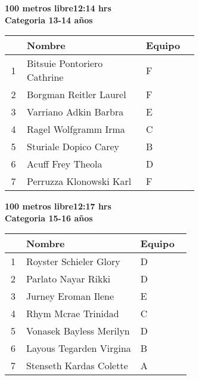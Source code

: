\begin{minipage}{0.95\linewidth}\vspace{0.5cm} 
\begin{flushleft}
\textbf{
\hspace{-0.15cm}100 metros libre\hspace{1.5cm}12:14 hrs \\Categoria 13-14 años}\vspace{-0.2cm} 
\end{flushleft}
\begin{tabular}{cp{0.63\linewidth}l}
\hline
& \textbf{Nombre} & \textbf{Equipo} \\ \hline
1 & Bitsuie Pontoriero Cathrine & F \\ 
2 & Borgman Reitler Laurel & F \\ 
3 & Varriano Adkin Barbra & E \\ 
4 & Ragel Wolfgramm Irma & C \\ 
5 & Sturiale Dopico Carey & B \\ 
6 & Acuff Frey Theola & D \\ 
7 & Perruzza Klonowski Karl & F \\ 
\end{tabular}
\end{minipage}
\begin{minipage}{0.95\linewidth}\vspace{0.5cm} 
\begin{flushleft}
\textbf{
\hspace{-0.15cm}100 metros libre\hspace{1.5cm}12:17 hrs \\Categoria 15-16 años}\vspace{-0.2cm} 
\end{flushleft}
\begin{tabular}{cp{0.63\linewidth}l}
\hline
& \textbf{Nombre} & \textbf{Equipo} \\ \hline
1 & Royster Schieler Glory & D \\ 
2 & Parlato Nayar Rikki & D \\ 
3 & Jurney Eroman Ilene & E \\ 
4 & Rhym Mcrae Trinidad & C \\ 
5 & Vonasek Bayless Merilyn & D \\ 
6 & Layous Tegarden Virgina & B \\ 
7 & Stenseth Kardas Colette & A \\ 
\end{tabular}
\end{minipage}
